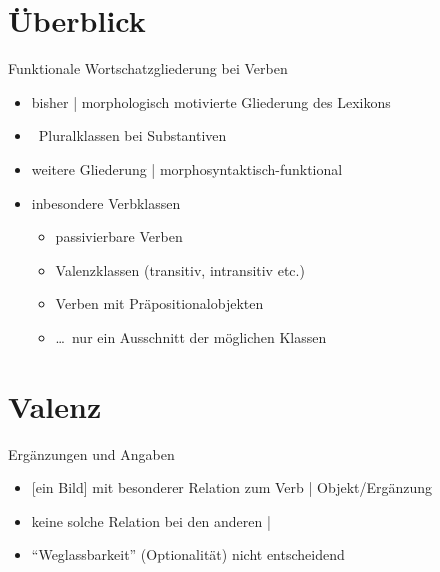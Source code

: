 \section{Überblick}

\begin{frame}
  {Funktionale Wortschatzgliederung bei Verben}
  \onslide<+->
  \begin{itemize}[<+->]
    \item bisher | \alert{morphologisch motivierte} Gliederung des Lexikons
    \item \zB\ Pluralklassen bei Substantiven
      \Zeile
    \item weitere Gliederung | \alert{morphosyntaktisch-funktional}
    \item inbesondere \alert{Verbklassen}
      \Halbzeile
      \begin{itemize}[<+->]
        \item \alert{passivierbare} Verben
        \item \alert{Valenzklassen} (transitiv, intransitiv etc.)
        \item Verben mit Präpositionalobjekten
        \item \ldots\ nur ein Ausschnitt der möglichen Klassen
      \end{itemize}
  \end{itemize}
\end{frame}

\section{Valenz}

\begin{frame}
  {Ergänzungen und Angaben}
  \onslide<+->
  \onslide<+->
  \begin{exe}
    \ex\label{ex:valenz034}
    \begin{xlist}
      \onslide<+->
      \onslide<+->
      \onslide<+->
    \end{xlist}
  \end{exe}
  \Halbzeile
  \begin{itemize}[<+->]
    \item \alert{[ein Bild]} mit besonderer Relation zum Verb | \alert{Objekt\slash Ergänzung}
    \item keine solche Relation bei den anderen | 
    \item "`Weglassbarkeit"' (Optionalität) nicht entscheidend
  \end{itemize}
\end{frame}

